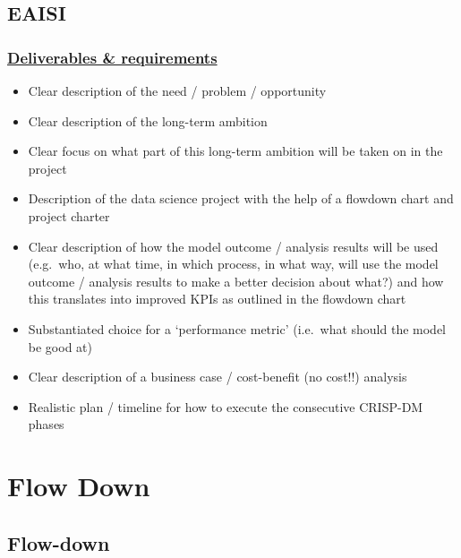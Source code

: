 \documentclass[
  american,
  10,
  a4paper,
]{book}
\providecommand{\tightlist}{%
  \setlength{\itemsep}{0pt}\setlength{\parskip}{0pt}}
\theoremstyle{definition}
\theoremstyle{remark}
\begin{document}
\section{EAISI}\label{sec-eaisi}

\subsection{\texorpdfstring{\href{https://academy.eaisi.nl/l/41851394}{Deliverables
\&
requirements}}{Deliverables \& requirements}}\label{deliverables-requirements}

\begin{itemize}
\tightlist
\item
  Clear description of the need / problem / opportunity
\item
  Clear description of the long-term ambition
\item
  Clear focus on what part of this long-term ambition will be taken on
  in the project
\item
  Description of the data science project with the help of a flowdown
  chart and project charter
\item
  Clear description of how the model outcome / analysis results will be
  used (e.g.~who, at what time, in which process, in what way, will use
  the model outcome / analysis results to make a better decision about
  what?) and how this translates into improved KPIs as outlined in the
  flowdown chart
\item
  Substantiated choice for a `performance metric' (i.e.~what should the
  model be good at)
\item
  Clear description of a business case / cost-benefit (no cost!!)
  analysis
\item
  Realistic plan / timeline for how to execute the consecutive CRISP-DM
  phases
\end{itemize}

\chapter{Flow Down}\label{flow-down}

\section{Flow-down}\label{sec-flowdown}
\end{document}
